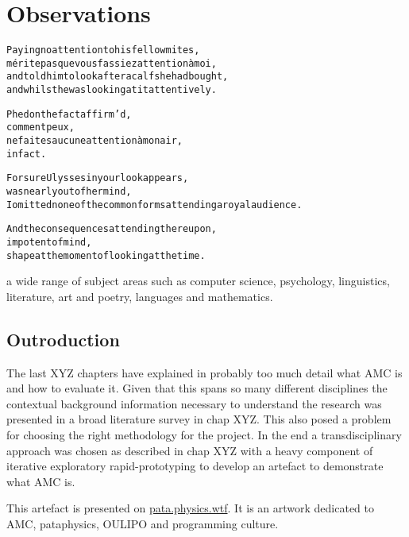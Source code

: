 
\chapter{Observations}
\label{ch:observations}

\startcontents[chapters]

\vfill

\begin{alltt}\sffamily
Paying no attention to his fellow mites,
mérite pas que vous fassiez attention à moi,
and told him to look after a calf she had bought,
and whilst he was looking at it attentively.

Phedon the fact affirm'd,
comment peux,
ne faites aucune attention à mon air,
in fact.

For sure Ulysses in your look appears,
was nearly out of her mind,
I omitted none of the common forms attending a royal audience.

And the consequences attending thereupon,
impotent of mind,
shape at the moment of looking at the time.
\end{alltt}

\newpage
\minicontents
\spirals


a wide range of subject areas such as computer science, psychology, linguistics, literature, art and poetry, languages and mathematics.


\section{Outroduction}

The last XYZ chapters have explained in probably too much detail what \ac{AMC} is and how to evaluate it. Given that this spans so many different disciplines the contextual background information necessary to understand the research was presented in a broad literature survey in chap XYZ. This also posed a problem for choosing the right methodology for the project. In the end a transdisciplinary approach was chosen as described in chap XYZ with a heavy component of iterative exploratory rapid-prototyping to develop an artefact to demonstrate what \ac{AMC} is. 

This artefact is presented on \url{pata.physics.wtf}. It is an artwork dedicated to \ac{AMC}, pataphysics, \ac{OULIPO} and programming culture.

